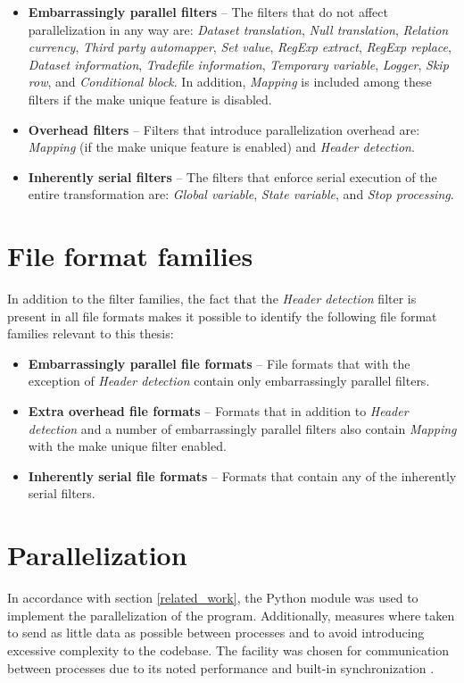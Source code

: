 \begin{itemize}
\item \textbf{Embarrassingly parallel filters} --
The filters that do not affect parallelization in any way are:
\textit{Dataset translation}, \textit{Null translation}, \textit{Relation currency},
\textit{Third party automapper}, \textit{Set value}, \textit{RegExp extract}, \textit{RegExp replace},
\textit{Dataset information}, \textit{Tradefile information}, \textit{Temporary variable}, \textit{Logger}, \textit{Skip row}, and \textit{Conditional block}.
In addition, \textit{Mapping} is included among these filters if the make unique feature is disabled.
\item \textbf{Overhead filters} -- 
Filters that introduce parallelization overhead are: \textit{Mapping} (if the make unique feature is enabled) and \textit{Header detection}.
\item \textbf{Inherently serial filters} --
The filters that enforce serial execution of the entire transformation are: \textit{Global variable}, \textit{State variable}, and \textit{Stop processing}.
\end{itemize}

\section{File format families}
In addition to the filter families, the fact that the \textit{Header detection} filter is present in all file formats makes it possible to identify the following
file format families relevant to this thesis:

\begin{itemize}
\item \textbf{Embarrassingly parallel file formats} --
  File formats that with the exception of \textit{Header detection} contain only embarrassingly parallel filters. 
\item \textbf{Extra overhead file formats} --
  Formats that in addition to \textit{Header detection} and a number of embarrassingly parallel filters also contain \textit{Mapping} with the make unique filter enabled.
\item \textbf{Inherently serial file formats} --
  Formats that contain any of the inherently serial filters.
\end{itemize}

\section{Parallelization}
In accordance with section \ref{related_work}, the Python  module was used to implement the parallelization of the program. Additionally, measures where taken to send as little
data as possible between processes and to avoid introducing excessive complexity to the codebase. The  facility was chosen for communication between processes due to its
noted performance and built-in synchronization \cite{singh_2013_parallel_padpwprfmm}.

